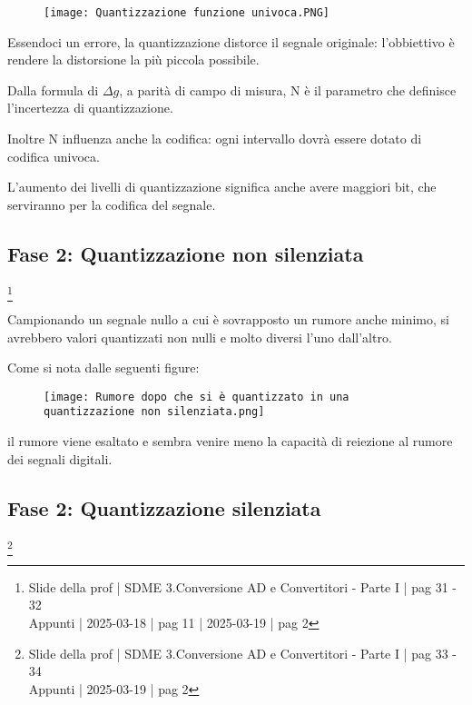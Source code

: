 \begin{figure}[h]
    \centering
    \texttt{[image: Quantizzazione funzione univoca.PNG]}
\end{figure} 

\newpage

Essendoci un errore, la quantizzazione distorce il segnale originale: l'obbiettivo è rendere la distorsione la più piccola possibile. \newline 

Dalla formula di $\Delta g$, a parità di campo di misura, N è il parametro che definisce l'incertezza di quantizzazione. \newline 

Inoltre N influenza anche la codifica: ogni intervallo dovrà essere dotato di codifica univoca. \newline 

L'aumento dei livelli di quantizzazione significa anche avere maggiori bit, 
che serviranno per la codifica del segnale. \newline 

\newpage 

\subsection{Fase 2: Quantizzazione non silenziata}
\footnote{Slide della prof | SDME 3.Conversione AD e Convertitori - Parte I | pag 31 - 32 \\  
Appunti | 2025-03-18 | pag 11 | 2025-03-19 | pag 2}

Campionando un segnale nullo a cui è sovrapposto un rumore anche minimo, si avrebbero valori quantizzati non nulli e molto diversi l'uno dall'altro. \newline 

Come si nota dalle seguenti figure: 

\begin{figure}[h]
    \centering
    \texttt{[image: Rumore dopo che si è quantizzato in una quantizzazione non silenziata.png]}
\end{figure} 

il rumore viene esaltato e sembra venire meno la capacità di reiezione al rumore dei segnali digitali. \newline 

\newpage 

\subsection{Fase 2: Quantizzazione silenziata}
\footnote{Slide della prof | SDME 3.Conversione AD e Convertitori - Parte I | pag 33 - 34 \\  
Appunti | 2025-03-19 | pag 2}

